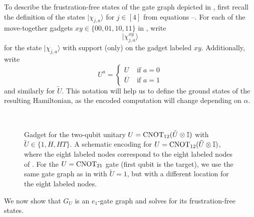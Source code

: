 \documentclass[../thesis-main/thesis-main]{subfiles}
\begin{document}
To describe the frustration-free states of the gate graph depicted in , first recall the definition of the states $|\chi_{j,a}\rangle$ for $j\in [4]$  from equations --. For each of the move-together gadgets $xy\in\{00,01,10,11\}$ in , write 
\begin{equation}
|\chi_{j,a}^{xy}\rangle
\end{equation}
for the state $|\chi_{j,a}\rangle$ with support (only) on the gadget labeled $xy$. Additionally, write 
\begin{equation}
  U^a=\begin{cases}
    U & \text{ if }a=0\\
    \overline{U} & \text{ if }a=1
  \end{cases}
\end{equation}
and similarly for $\tilde U$.  This notation will help us to define the ground states of the resulting Hamiltonian, as the encoded computation will change depending on $\alpha$.

\begin{figure}
\centering 
{}\\
\caption{ Gadget for the
 two-qubit unitary $U=\mathrm{CNOT}_{12}(\tilde U\otimes\mathbb{I})$ with $\tilde U\in \{1,H,HT\}$.  A schematic encoding for $U=\mathrm{CNOT}_{12}(\tilde U\otimes \mathbb{I})$, where the eight labeled nodes correspond to the eight labeled nodes of .
 For the $U=\mathrm{CNOT}_{21}$ gate (first qubit is the target), we use the same gate graph as in  with $\tilde U=1$, but with a different location for the eight labeled nodes.}
\label{fig:GVcnot_tot}
\end{figure}


We now show that $G_{U}$ is an $e_{1}$-gate graph and solves for its frustration-free states.
\end{document}
